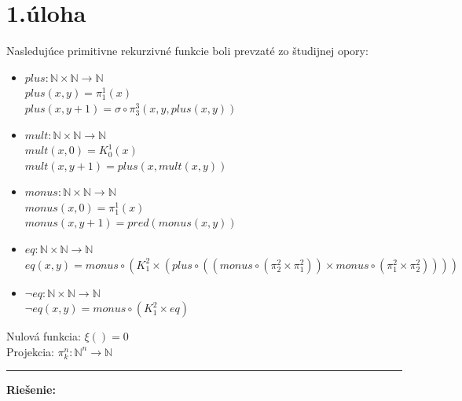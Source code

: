 \documentclass[11pt,a4paper]{article}
\begin{document}
\setlength{\parskip}{0pt}
    \hypersetup{hidelinks}\tableofcontents
\setlength{\parskip}{0pt}

\newpage



\section{1.úloha}

Nasledujúce primitivne rekurzivné funkcie boli prevzaté zo študijnej opory\cite{AA}:
\begin{itemize}
    \item $ plus : \mathbb N \times \mathbb N \rightarrow \mathbb N$ \\
     $ plus(x, y) = \pi_1^1(x)$ \\
     $ plus(x, y + 1) = \sigma \circ \pi_3^3(x, y, plus(x, y))$ 

    \item $ mult : \mathbb N \times \mathbb N \rightarrow \mathbb N$ \\
    $ mult(x, 0) = K_0^1(x) $ \\
    $ mult(x, y + 1) = plus(x, mult(x, y)) $

    \item $ monus : \mathbb N \times \mathbb N \rightarrow \mathbb N$ \\
    $ monus(x, 0) = \pi_1^1(x) $ \\
    $ monus(x, y + 1) = pred(monus(x, y)) $

    \item $ eq : \mathbb N \times \mathbb N \rightarrow \mathbb N$ \\
    $ eq(x, y) = monus \circ ( K_1^2 \times (plus \circ ((monus \circ (\pi_2^2 \times \pi_1^2)) \times monus \circ (\pi_1^2 \times \pi_2^2)))) $

    \item $ \neg eq : \mathbb N \times \mathbb N \rightarrow \mathbb N$ \\
    $ \neg eq(x, y) = monus \circ (K_1^2 \times eq) $
\end{itemize}

Nulová funkcia: $ \xi() = 0 $ \\

Projekcia: $ \pi_k^n : \mathbb N^n \rightarrow \mathbb N$

\noindent\rule{\textwidth}{1pt}
\textbf{Riešenie:} \\
\end{document}
